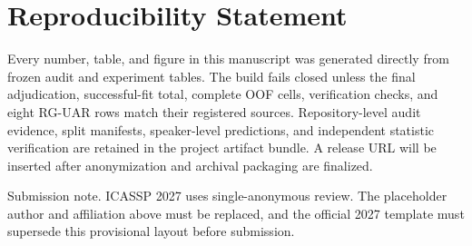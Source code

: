 \documentclass{article}
\begin{document}
\section{Reproducibility Statement}

Every number, table, and figure in this manuscript was generated directly from frozen audit and experiment tables.
The build fails closed unless the final adjudication, successful-fit total, complete OOF cells, verification checks, and eight RG-UAR rows match their registered sources.
Repository-level audit evidence, split manifests, speaker-level predictions, and independent statistic verification are retained in the project artifact bundle.
A release URL will be inserted after anonymization and archival packaging are finalized.

Submission note.
ICASSP 2027 uses single-anonymous review.
The placeholder author and affiliation above must be replaced, and the official 2027 template must supersede this provisional layout before submission.
\end{document}
